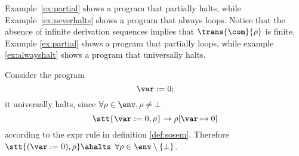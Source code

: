 Example~\ref{ex:partial} shows a program that partially halts, while
Example~\ref{ex:neverhalts} shows a program that always loops.  Notice
that the absence of infinite derivation sequences implies that \(\trans{\com}{\rho}\)
is finite.  Example \ref{ex:partial} shows a program that partially
loops, while example \ref{ex:alwayshalt} shows a program that
universally halts.


\begin{example}\label{ex:alwayshalt}
  Consider the program
  \begin{equation*}
    \var := 0;
  \end{equation*}
  it universally halts, since \(\forall\rho \in \env, \rho \neq \bot\)
  \[\stt{\var := 0, \rho} \to \rho[\var \mapsto 0]\] according to the
  expr rule in definition \ref{def:sosem}. Therefore
  \(\stt{(\var := 0), \rho} \ahalts\)
  \(\forall \rho \in \env\setminus\{\bot\}\).
\end{example}

